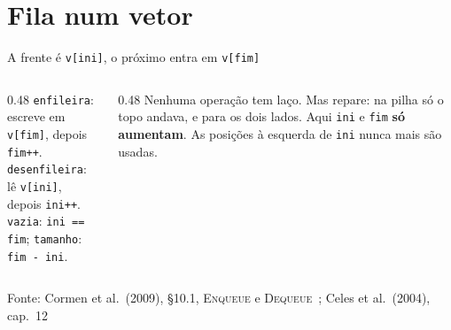 \documentclass[aspectratio=169]{beamer}
\newcommand{\fonte}[1]{\vfill\hfill{\scriptsize\textcolor{UFSGray}{Fonte: #1}}}
\begin{document}
\section{Fila num vetor}

\begin{frame}{A frente é \texttt{v[ini]}, o próximo entra em \texttt{v[fim]}}
  \begin{center}
  \end{center}
  \begin{columns}[T]
    \begin{column}{0.48\textwidth}
      \small
      \texttt{enfileira}: escreve em \texttt{v[fim]}, depois \texttt{fim++}.\\
      \texttt{desenfileira}: lê \texttt{v[ini]}, depois \texttt{ini++}.\\
      \texttt{vazia}: \texttt{ini == fim}; \texttt{tamanho}: \texttt{fim - ini}.
    \end{column}
    \begin{column}{0.48\textwidth}
      \small Nenhuma operação tem laço. Mas repare: na pilha só o topo
      andava, e para os dois lados. Aqui \texttt{ini} e \texttt{fim}
      \textbf{só aumentam}. As posições à esquerda de \texttt{ini} nunca
      mais são usadas.
    \end{column}
  \end{columns}
  \fonte{Cormen et al.\ (2009), §10.1, \textsc{Enqueue} e \textsc{Dequeue}~\cite{cormen2009introduction};
    Celes et al.\ (2004), cap.~12~\cite{celes2004introducao}}
\end{frame}
\end{document}
